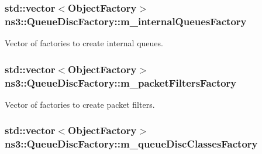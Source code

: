 \subsubsection[{\texorpdfstring{m\+\_\+internal\+Queues\+Factory}{m_internalQueuesFactory}}]{\setlength{\rightskip}{0pt plus 5cm}std\+::vector$<${\bf Object\+Factory}$>$ ns3\+::\+Queue\+Disc\+Factory\+::m\+\_\+internal\+Queues\+Factory\hspace{0.3cm}{\ttfamily [private]}}\hypertarget{classns3_1_1QueueDiscFactory_a1662d1d7c56f001ee2cec98eeffd641e}{}\label{classns3_1_1QueueDiscFactory_a1662d1d7c56f001ee2cec98eeffd641e}


Vector of factories to create internal queues. 

\subsubsection[{\texorpdfstring{m\+\_\+packet\+Filters\+Factory}{m_packetFiltersFactory}}]{\setlength{\rightskip}{0pt plus 5cm}std\+::vector$<${\bf Object\+Factory}$>$ ns3\+::\+Queue\+Disc\+Factory\+::m\+\_\+packet\+Filters\+Factory\hspace{0.3cm}{\ttfamily [private]}}\hypertarget{classns3_1_1QueueDiscFactory_aba9caa76a10faa6bb43d8e8a43125dcb}{}\label{classns3_1_1QueueDiscFactory_aba9caa76a10faa6bb43d8e8a43125dcb}


Vector of factories to create packet filters. 

\subsubsection[{\texorpdfstring{m\+\_\+queue\+Disc\+Classes\+Factory}{m_queueDiscClassesFactory}}]{\setlength{\rightskip}{0pt plus 5cm}std\+::vector$<${\bf Object\+Factory}$>$ ns3\+::\+Queue\+Disc\+Factory\+::m\+\_\+queue\+Disc\+Classes\+Factory\hspace{0.3cm}{\ttfamily [private]}}\hypertarget{classns3_1_1QueueDiscFactory_ad173551ed51d3398656bc755a7e28290}{}\label{classns3_1_1QueueDiscFactory_ad173551ed51d3398656bc755a7e28290}


